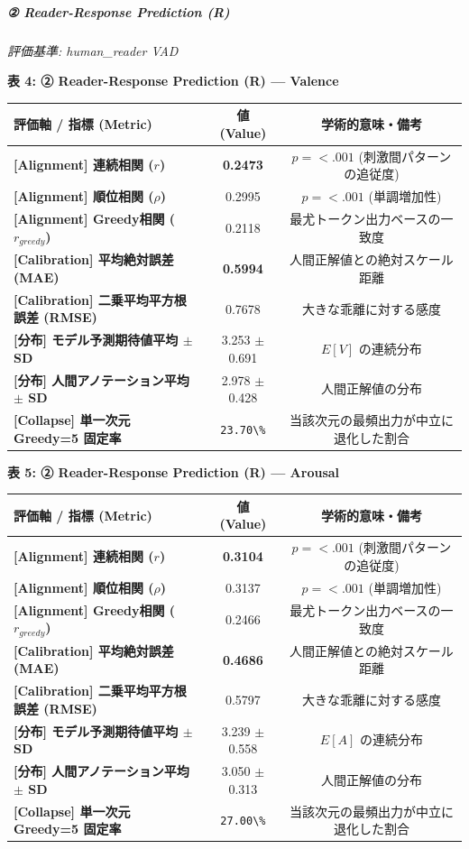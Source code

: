 \subparagraph{② Reader-Response Prediction (R)}
\textit{評価基準: human\_reader VAD}

\textbf{表 4: ② Reader-Response Prediction (R) — Valence}
\begin{center}
\small
\begin{tabular}{lcc}
\toprule
\textbf{評価軸 / 指標 (Metric)} & \textbf{値 (Value)} & \textbf{学術的意味・備考} \\
\midrule
\textbf{[Alignment] 連続相関 ($r$)} & \textbf{0.2473} & $p = <.001 $ (刺激間パターンの追従度) \\
\textbf{[Alignment] 順位相関 ($\rho$)} & 0.2995 & $p = <.001 $ (単調増加性) \\
\textbf{[Alignment] Greedy相関 ($r_{greedy}$)} & 0.2118 & 最尤トークン出力ベースの一致度 \\
\textbf{[Calibration] 平均絶対誤差 (MAE)} & \textbf{0.5994} & 人間正解値との絶対スケール距離 \\
\textbf{[Calibration] 二乗平均平方根誤差 (RMSE)} & 0.7678 & 大きな乖離に対する感度 \\
\textbf{[分布] モデル予測期待値平均 $\pm$ SD} & 3.253 $\pm$ 0.691 & $E[V]$ の連続分布 \\
\textbf{[分布] 人間アノテーション平均 $\pm$ SD} & 2.978 $\pm$ 0.428 & 人間正解値の分布 \\
\textbf{[Collapse] 単一次元 Greedy=5 固定率} & \texttt{23.70\textbackslash{}\%} & 当該次元の最頻出力が中立に退化した割合 \\
\bottomrule
\end{tabular}
\end{center}


\textbf{表 5: ② Reader-Response Prediction (R) — Arousal}
\begin{center}
\small
\begin{tabular}{lcc}
\toprule
\textbf{評価軸 / 指標 (Metric)} & \textbf{値 (Value)} & \textbf{学術的意味・備考} \\
\midrule
\textbf{[Alignment] 連続相関 ($r$)} & \textbf{0.3104} & $p = <.001 $ (刺激間パターンの追従度) \\
\textbf{[Alignment] 順位相関 ($\rho$)} & 0.3137 & $p = <.001 $ (単調増加性) \\
\textbf{[Alignment] Greedy相関 ($r_{greedy}$)} & 0.2466 & 最尤トークン出力ベースの一致度 \\
\textbf{[Calibration] 平均絶対誤差 (MAE)} & \textbf{0.4686} & 人間正解値との絶対スケール距離 \\
\textbf{[Calibration] 二乗平均平方根誤差 (RMSE)} & 0.5797 & 大きな乖離に対する感度 \\
\textbf{[分布] モデル予測期待値平均 $\pm$ SD} & 3.239 $\pm$ 0.558 & $E[A]$ の連続分布 \\
\textbf{[分布] 人間アノテーション平均 $\pm$ SD} & 3.050 $\pm$ 0.313 & 人間正解値の分布 \\
\textbf{[Collapse] 単一次元 Greedy=5 固定率} & \texttt{27.00\textbackslash{}\%} & 当該次元の最頻出力が中立に退化した割合 \\
\bottomrule
\end{tabular}
\end{center}


